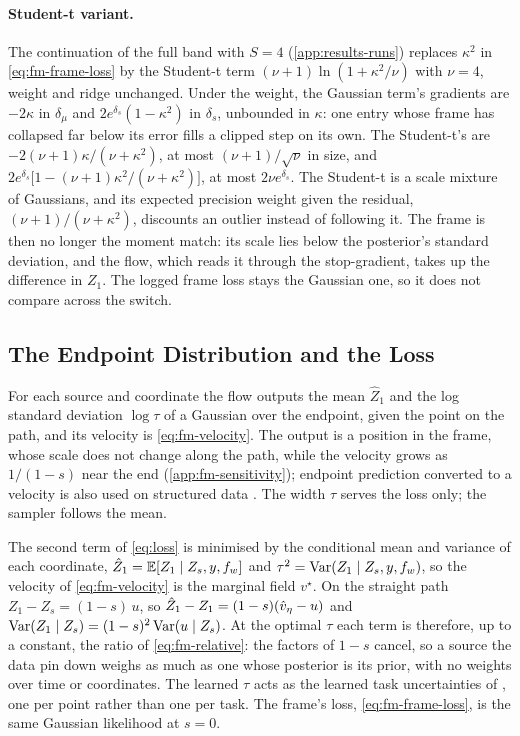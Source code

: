 \paragraph{Student-t variant.}
The continuation of the full band with $S=4$ (\cref{app:results-runs}) replaces $\kappa^2$ in
\cref{eq:fm-frame-loss} by the Student-t term $(\nu+1)\ln(1+\kappa^2/\nu)$ with $\nu=4$, weight and
ridge unchanged. Under the weight, the Gaussian term's gradients are $-2\kappa$ in $\delta_\mu$ and
$2e^{\delta_s}(1-\kappa^2)$ in $\delta_s$, unbounded in $\kappa$: one entry whose frame has
collapsed far below its error fills a clipped step on its own. The Student-t's are
$-2(\nu+1)\kappa/(\nu+\kappa^2)$, at most $(\nu+1)/\sqrt\nu$ in size, and
$2e^{\delta_s}\bigl[1-(\nu+1)\kappa^2/(\nu+\kappa^2)\bigr]$, at most $2\nu e^{\delta_s}$. The
Student-t is a scale mixture of Gaussians, and its expected precision weight given the residual,
$(\nu+1)/(\nu+\kappa^2)$, discounts an outlier instead of following it. The frame is then no longer
the moment match: its scale lies below the posterior's standard deviation, and the flow, which
reads it through the stop-gradient, takes up the difference in $Z_1$. The logged frame loss stays
the Gaussian one, so it does not compare across the switch.

\subsection{The Endpoint Distribution and the Loss}
\label{app:fm-loss}

For each source and coordinate the flow outputs the mean $\hat Z_1$ and the log standard deviation
$\log\tau$ of a Gaussian over the endpoint, given the point on the path, and its velocity is
\cref{eq:fm-velocity}. The output is a position in the frame, whose scale does not change along the
path, while the velocity grows as $1/(1-s)$ near the end (\cref{app:fm-sensitivity}); endpoint
prediction converted to a velocity is also used on structured data \citep{stark2024harmonic}. The
width $\tau$ serves the loss only; the sampler follows the mean.

The second term of \cref{eq:loss} is minimised by the conditional mean and variance of each
coordinate, $\hat Z_1 = \mathbb{E}[Z_1\mid Z_s,y,f_{w}]$ and $\tau^2 = \operatorname{Var}(Z_1\mid Z_s,y,f_{w})$, so the
velocity of \cref{eq:fm-velocity} is the marginal field $v^\star$. On the straight path
$Z_1 - Z_s = (1-s)\,u$, so $\hat Z_1 - Z_1 = (1-s)(\hat v_{\eta} - u)$ and
$\operatorname{Var}(Z_1\mid Z_s) = (1-s)^2\operatorname{Var}(u\mid Z_s)$. At the optimal $\tau$ each term is therefore, up to
a constant, the ratio of \cref{eq:fm-relative}: the factors of $1-s$ cancel, so a source the data pin
down weighs as much as one whose posterior is its prior, with no weights over time or coordinates.
The learned $\tau$ acts as the learned task uncertainties of \citet{kendall2018multi}, one per point
rather than one per task. The frame's loss, \cref{eq:fm-frame-loss}, is the same Gaussian likelihood
at $s=0$.

